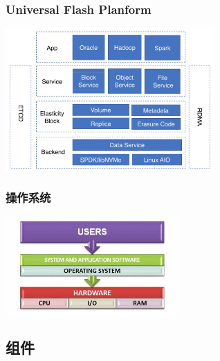 \documentclass[UTF8,8pt,xcolor=dvipsnames]{beamer}
\begin{document}
\begin{frame}[fragile]
    \frametitle{Universal Flash Planform}
    \begin{center}
        \includegraphics[width=0.6\textwidth]{../imgs/universal-flash.png}
    \end{center}
\end{frame}

\begin{frame}[fragile]
    \frametitle{操作系统}
    \begin{center}
        \includegraphics[width=0.5\textwidth]{../imgs/operating-system.jpeg}
    \end{center}
\end{frame}

\subsection{组件}
\end{document}
